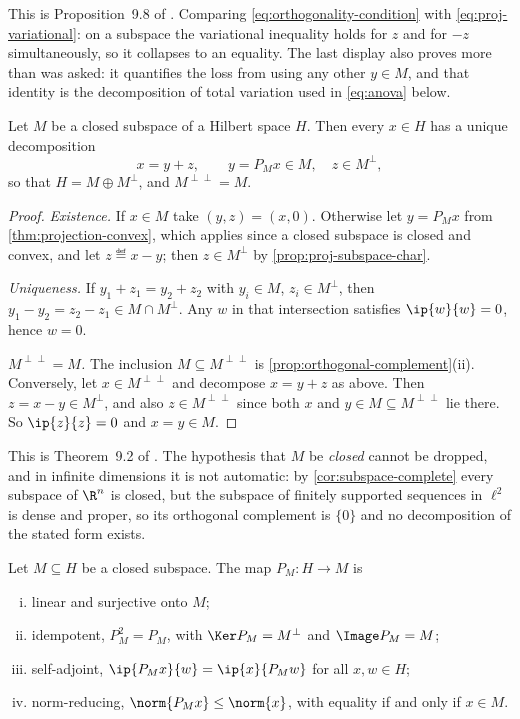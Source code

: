 This is Proposition~9.8 of \textcite[p.~301]{fukuda2026notes}. Comparing
\eqref{eq:orthogonality-condition} with \eqref{eq:proj-variational}: on a
subspace the variational inequality holds for $z$ and for $-z$ simultaneously,
so it collapses to an equality. The last display also proves more than was asked:
it quantifies the loss from using any other $y\in M$, and that identity is the
decomposition of total variation used in \autoref{eq:anova} below.

\begin{theorem}\label{thm:orthogonal-decomposition}
	Let $M$ be a closed subspace of a Hilbert space $H$. Then every $x\in H$ has a
	unique decomposition
	\[
		x=y+z,\qquad y=P_Mx\in M,\quad z\in M^{\perp},
	\]
	so that $H=M\oplus M^{\perp}$, and $M^{\perp\perp}=M$.
\end{theorem}

\begin{proof}
	\emph{Existence.} If $x\in M$ take $(y,z)=(x,0)$. Otherwise let $y=P_Mx$ from
	\autoref{thm:projection-convex}, which applies since a closed subspace is closed
	and convex, and let $z\eqdef x-y$; then $z\in M^{\perp}$ by
	\autoref{prop:proj-subspace-char}.

	\emph{Uniqueness.} If $y_1+z_1=y_2+z_2$ with $y_i\in M$, $z_i\in M^{\perp}$,
	then $y_1-y_2=z_2-z_1\in M\cap M^{\perp}$. Any $w$ in that intersection
	satisfies $\ip{w}{w}=0$, hence $w=0$.

	\emph{$M^{\perp\perp}=M$.} The inclusion $M\subseteq M^{\perp\perp}$ is
	\autoref{prop:orthogonal-complement}(ii). Conversely, let
	$x\in M^{\perp\perp}$ and decompose $x=y+z$ as above. Then
	$z=x-y\in M^{\perp}$, and also $z\in M^{\perp\perp}$ since both $x$ and
	$y\in M\subseteq M^{\perp\perp}$ lie there. So $\ip{z}{z}=0$ and $x=y\in M$.
\end{proof}

This is Theorem~9.2 of \textcite[p.~302]{fukuda2026notes}. The hypothesis that
$M$ be \emph{closed} cannot be dropped, and in infinite dimensions it is not
automatic: by \autoref{cor:subspace-complete} every subspace of $\R^n$ is closed,
but the subspace of finitely supported sequences in $\ell^2$ is dense and proper,
so its orthogonal complement is $\{0\}$ and no decomposition of the stated form
exists.

\begin{proposition}\label{prop:projection-operator}
	Let $M\subseteq H$ be a closed subspace. The map $P_M\colon H\to M$ is
	\begin{enumerate}[(i)]
		\item linear and surjective onto $M$;
		\item idempotent, $P_M^2=P_M$, with $\Ker P_M=M^{\perp}$ and
		      $\Image P_M=M$;
		\item self-adjoint, $\ip{P_Mx}{w}=\ip{x}{P_Mw}$ for all $x,w\in H$;
		\item norm-reducing, $\norm{P_Mx}\leq\norm{x}$, with equality if and only if
		      $x\in M$.
	\end{enumerate}
\end{proposition}

